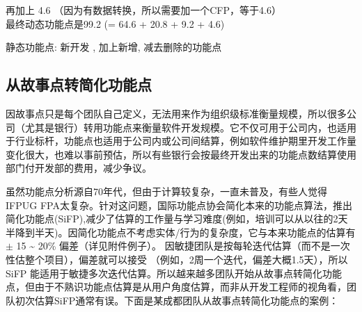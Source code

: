 再加上 4.6 （因为有数据转换，所以需要加一个CFP，等于4.6）\\
最终动态功能点是99.2 (= 64.6 + 20.8 + 9.2 + 4.6)

静态功能点: 新开发 , 加上新增, 减去删除的功能点

\begin{description}
\item[]
\end{description}

\hypertarget{ux4eceux6545ux4e8bux70b9ux8f6cux7b80ux5316ux529fux80fdux70b9}{%
\subsection{从故事点转简化功能点}\label{ux4eceux6545ux4e8bux70b9ux8f6cux7b80ux5316ux529fux80fdux70b9}}

因故事点只是每个团队自己定义，无法用来作为组织级标准衡量规模，所以很多公司（尤其是银行）转用功能点来衡量软件开发规模。它不仅可用于公司内，也适用于行业标杆，功能点也适用于公司内或公司间结算，例如软件维护期里开发工作量变化很大，也难以事前预估，所以有些银行会按最终开发出来的功能点数结算使用部门付开发部的费用，减少争议。

虽然功能点分析源自70年代，但由于计算较复杂，一直未普及，有些人觉得IFPUG
FPA太复杂。针对这问题，国际功能点协会简化本来的功能点算法，推出简化功能点(SiFP),减少了估算的工作量与学习难度(例如，培训可以从以往的2天半降到半天)。因简化功能点不考虑实体/行为的复杂度，它与本来功能点的估算有\(\pm\)
15 \textasciitilde{} 20\% 偏差（详见附件例子）。
因敏捷团队是按每轮迭代估算（而不是一次性估整个项目），偏差就可以接受
（例如，2周一个迭代，偏差大概1.5天），所以SiFP
能适用于敏捷多次迭代估算。所以越来越多团队开始从故事点转简化功能点，但由于不熟识功能点估算是从用户角度估算，而非从开发工程师的视角看，团队初次估算SiFP通常有误。下面是某成都团队从故事点转简化功能点的案例：

